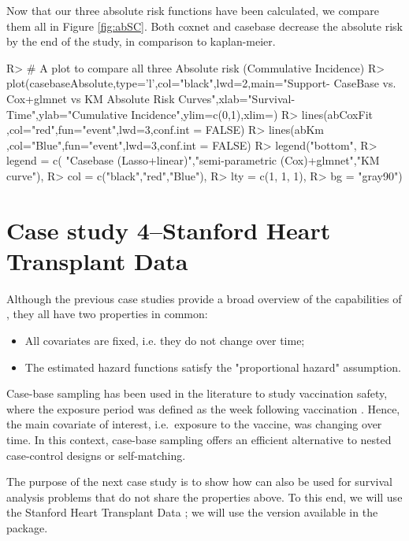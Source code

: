 \documentclass[
]{jss}
\begin{document}
Now that our three absolute risk functions have been calculated, we
compare them all in Figure \ref{fig:abSC}. Both coxnet and casebase
decrease the absolute risk by the end of the study, in comparison to
kaplan-meier.

\begin{CodeChunk}

\begin{CodeInput}
R> # A plot to compare all three Absolute risk (Commulative Incidence)
R> plot(casebaseAbsolute,type='l',col="black",lwd=2,main="Support- CaseBase vs. Cox+glmnet vs KM Absolute Risk Curves",xlab="Survival-Time",ylab="Cumulative Incidence",ylim=c(0,1),xlim=)
R> lines(abCoxFit ,col="red",fun="event",lwd=3,conf.int = FALSE)
R> lines(abKm ,col="Blue",fun="event",lwd=3,conf.int = FALSE)
R> legend("bottom", 
R>        legend = c( "Casebase (Lasso+linear)","semi-parametric (Cox)+glmnet","KM curve"), 
R>        col = c("black","red","Blue"),
R>        lty = c(1, 1, 1), 
R>        bg = "gray90")
\end{CodeInput}
\end{CodeChunk}

\hypertarget{case-study-4stanford-heart-transplant-data}{%
\section{Case study 4--Stanford Heart Transplant
Data}\label{case-study-4stanford-heart-transplant-data}}

Although the previous case studies provide a broad overview of the
capabilities of , they all have two properties in common:

\begin{itemize}
  \item All covariates are fixed, i.e. they do not change over time;
  \item The estimated hazard functions satisfy the "proportional hazard" assumption.
\end{itemize}

Case-base sampling has been used in the literature to study vaccination
safety, where the exposure period was defined as the week following
vaccination \citep{saarela2015case}. Hence, the main covariate of
interest, i.e.~exposure to the vaccine, was changing over time. In this
context, case-base sampling offers an efficient alternative to nested
case-control designs or self-matching.

The purpose of the next case study is to show how  can
also be used for survival analysis problems that do not share the
properties above. To this end, we will use the Stanford Heart Transplant
Data \citep[\citet{crowley1977covariance}]{clark1971cardiac}; we will
use the version available in the  package.
\end{document}
